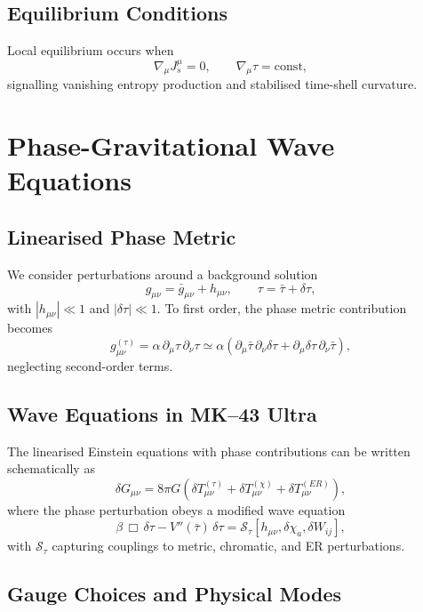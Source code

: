 \section{Equilibrium Conditions}

Local equilibrium occurs when
\[
\nabla_\mu J^\mu_s = 0,\qquad \nabla_\mu \tau = \mathrm{const},
\]
signalling vanishing entropy production and stabilised time-shell curvature.


\chapter{Phase-Gravitational Wave Equations}

\section{Linearised Phase Metric}

We consider perturbations around a background solution
\[
g_{\mu\nu} = \bar{g}_{\mu\nu} + h_{\mu\nu},\qquad
\tau = \bar{\tau} + \delta\tau,
\]
with $|h_{\mu\nu}|\ll 1$ and $|\delta\tau|\ll 1$.
To first order, the phase metric contribution becomes
\[
g^{(\tau)}_{\mu\nu}
=
\alpha\, \partial_\mu \tau\, \partial_\nu\tau
\simeq
\alpha\left(
\partial_\mu \bar{\tau}\, \partial_\nu \delta\tau
+
\partial_\mu \delta\tau\, \partial_\nu \bar{\tau}
\right),
\]
neglecting second-order terms.

\section{Wave Equations in MK--43 Ultra}

The linearised Einstein equations with phase contributions can be written schematically as
\[
\delta G_{\mu\nu}
=
8\pi G\left(
\delta T_{\mu\nu}^{(\tau)}
+
\delta T_{\mu\nu}^{(\chi)}
+
\delta T_{\mu\nu}^{(ER)}
\right),
\]
where the phase perturbation obeys a modified wave equation
\[
\beta\, \Box\, \delta\tau
- V''(\bar{\tau})\, \delta\tau
=
\mathcal{S}_{\tau}[h_{\mu\nu},\delta\chi_a,\delta W_{ij}],
\]
with $\mathcal{S}_{\tau}$ capturing couplings to metric, chromatic, and ER perturbations.

\section{Gauge Choices and Physical Modes}

